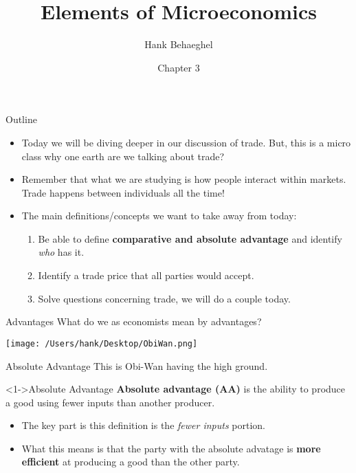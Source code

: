 \documentclass[aspectratio=169]{beamer}
\title{Elements of Microeconomics}
\author{Hank Behaeghel}
\institute{Johns Hopkins University}
\date{Chapter 3}
\begin{document}
\maketitle

\begin{frame}{Outline}
    \begin{itemize}
        \item Today we will be diving deeper in our discussion of trade.
        But, this is a micro class why one earth are we talking about trade?
        \item Remember that what we are studying is how people interact within markets. Trade happens between individuals all the time!
        \item The main definitions/concepts we want to take away from today:
        \begin{enumerate}
            \item Be able to define \textbf{comparative and absolute advantage} and identify \textit{who} has it.
            \item Identify a trade price that all parties would accept.
            \item Solve questions concerning trade, we will do a couple today.
        \end{enumerate}
    \end{itemize}
\end{frame}

\begin{frame}{Advantages}
What do we as economists mean by advantages?
    \begin{center}
        \texttt{[image: /Users/hank/Desktop/ObiWan.png]}
    \end{center}
\end{frame}


\begin{frame}{Absolute Advantage}
    This is Obi-Wan having the high ground.
   \begin{block} <1->{Absolute Advantage}
        \textbf{Absolute advantage (AA)} is the ability to produce a good using fewer inputs than another producer.
    \end{block}
    
    \begin{itemize}
        \item<2-> The key part is this definition is the \textit{fewer inputs} portion.
        \item<3-> What this means is that the party with the absolute advatage is \textbf{more efficient} at producing a good than the other party.
    \end{itemize}
\end{frame}
\end{document}
